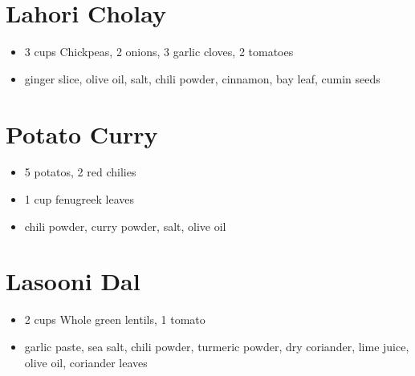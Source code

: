 \documentclass[10pt]{extarticle}
\begin{document}
		\section{Lahori Cholay}
		\begin{itemize}
			\item 3 cups Chickpeas, 2 onions, 3 garlic cloves, 2 tomatoes
			\item ginger slice, olive oil, salt, chili powder, cinnamon, bay leaf, cumin seeds
		\end{itemize}
		\section{Potato Curry}
		\begin{itemize}
			\item 5 potatos, 2 red chilies
			\item 1 cup fenugreek leaves
			\item chili powder, curry powder, salt, olive oil
		\end{itemize}
		\section{Lasooni Dal}
		\begin{itemize}
			\item 2 cups Whole green lentils, 1 tomato
			\item garlic paste, sea salt, chili powder, turmeric powder, dry coriander, lime juice, olive oil, coriander leaves
		\end{itemize}
\end{document}
